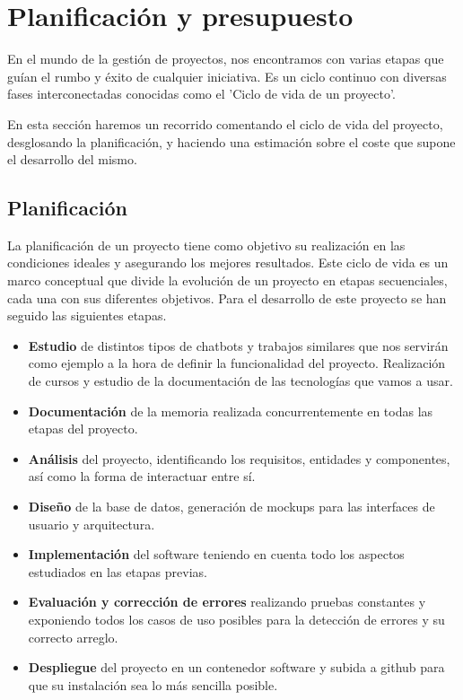 \chapter{Planificación y presupuesto}

En el mundo de la gestión de proyectos, nos encontramos con varias etapas que guían el rumbo y éxito de cualquier iniciativa. Es un ciclo continuo con diversas fases interconectadas conocidas como el 'Ciclo de vida de un proyecto'. 

En esta sección haremos un recorrido comentando el ciclo de vida del proyecto, desglosando la planificación, y haciendo una estimación sobre el coste que supone el desarrollo del mismo.\vspace{0.3cm}

\section{Planificación}

La planificación de un proyecto tiene como objetivo su realización en las condiciones ideales y asegurando los mejores resultados. Este ciclo de vida es un marco conceptual que divide la evolución de un proyecto en etapas secuenciales, cada una con sus diferentes objetivos. Para el desarrollo de este proyecto se han seguido las siguientes etapas. 

\begin{itemize}
    \item \textbf{Estudio} de distintos tipos de chatbots y trabajos similares que nos servirán como ejemplo a la hora de definir la funcionalidad del proyecto. Realización de cursos y estudio de la documentación de las tecnologías que vamos a usar.
    \item \textbf{Documentación} de la memoria realizada concurrentemente en todas las etapas del proyecto. 
    \item \textbf{Análisis} del proyecto, identificando los requisitos, entidades y componentes, así como la forma de interactuar entre sí. 
    \item \textbf{Diseño} de la base de datos, generación de mockups para las interfaces de usuario y arquitectura. 
    \item \textbf{Implementación} del software teniendo en cuenta todo los aspectos estudiados en las etapas previas.
    \item \textbf{Evaluación y corrección de errores} realizando pruebas constantes y exponiendo todos los casos de uso posibles para la detección de errores y su correcto arreglo. 
    \vspace{0.3cm}
    \item \textbf{Despliegue} del proyecto en un contenedor software y subida a github para que su instalación sea lo más sencilla posible. 
    
\end{itemize}\vspace{0.5cm}

